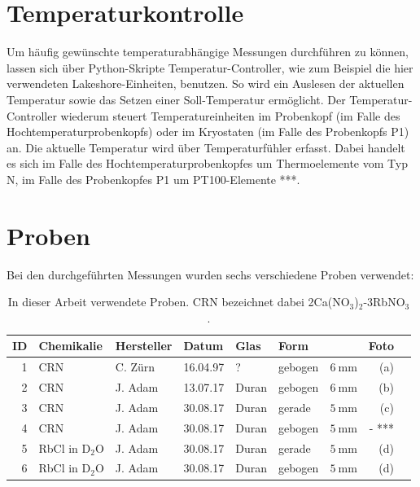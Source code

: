 \section{Temperaturkontrolle} \label{section:exp:temperaturkontrolle}

Um häufig gewünschte temperaturabhängige Messungen durchführen zu können, lassen sich über Python-Skripte Temperatur-Controller, wie zum Beispiel die hier verwendeten Lakeshore-Einheiten, benutzen. So wird ein Auslesen der aktuellen Temperatur sowie das Setzen einer Soll-Temperatur ermöglicht. Der Temperatur-Controller wiederum steuert Temperatureinheiten im Probenkopf (im Falle des Hochtemperaturprobenkopfs) oder im Kryostaten (im Falle des Probenkopfs P1) an. Die aktuelle Temperatur wird über Temperaturfühler erfasst. Dabei handelt es sich im Falle des Hochtemperaturprobenkopfes um Thermoelemente vom Typ N, im Falle des Probenkopfes P1 um PT100-Elemente ***.





\section{Proben} \label{section:exp:proben}

Bei den durchgeführten Messungen wurden sechs verschiedene Proben verwendet:

\begin{table}[H]
	\centering
	\begin{tabular}{rllllllrl}
		\hline
		ID & Chemikalie & Hersteller & Datum & Glas & Form & \diameter & Foto \\ 
		\hline
		1	& CRN &	C. Zürn &	16.04.97 &	? &	gebogen & 	$\SI{6}{\milli\meter}$ &	(a) \\
2	& CRN &	J. Adam &	13.07.17 &	Duran &	gebogen & 	$\SI{6}{\milli\meter}$ &	(b) \\
3	& CRN &	J. Adam &	30.08.17 &	Duran &	gerade & 	$\SI{5}{\milli\meter}$ &	(c) \\
4	& CRN &	J. Adam &	30.08.17 &	Duran &	gebogen & 	$\SI{5}{\milli\meter}$ &	- *** \\
5	& RbCl in D$_\text{2}$O &	J. Adam &	30.08.17 &	Duran &	gerade & 	$\SI{5}{\milli\meter}$ &	(d) \\
6	& RbCl in D$_\text{2}$O &	J. Adam &	30.08.17 &	Duran &	gebogen & 	$\SI{5}{\milli\meter}$ &	(d) \\ \hline
	\end{tabular} 
	\caption{In dieser Arbeit verwendete Proben. CRN bezeichnet dabei 2Ca(NO$_\text{3}$)$_\text{2}$-3RbNO$_\text{3}$. \label{tab:exp:proben}}
\end{table}

